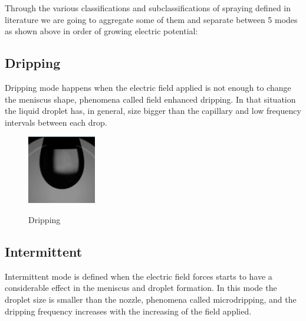 Through the various classifications and subclassifications of spraying defined in literature we are going to aggregate some of them and separate between 5 modes as shown above in order of growing electric potential:

\subsection{Dripping}
\label{subsec:dripping}

Dripping mode happens when the electric field applied is not enough to change the meniscus shape, phenomena called field enhanced dripping.
In that situation the liquid droplet has, in general, size bigger than the capillary and low frequency intervals between each drop.

\begin{figure}[H]
  \center
  \includegraphics[width=3cm]{Figuras/19:03/drip_example.png}
  \label{fig:drip_example}
  \caption{Dripping}
\end{figure}

\subsection{Intermittent}
\label{subsec:Intermittent}

Intermittent mode is defined when the electric field forces starts to have a considerable effect in the meniscus and droplet formation. 
In this mode the droplet size is smaller than the nozzle, phenomena called microdripping, and the dripping frequency increases with the increasing of the field applied.


